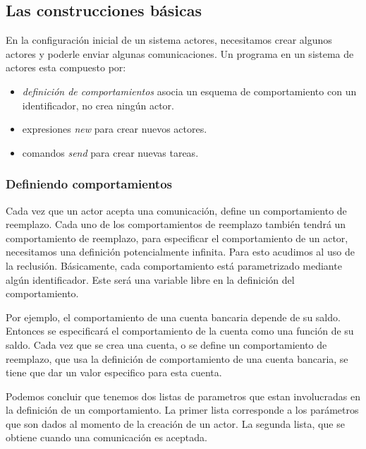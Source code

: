 \subsection{Las construcciones básicas}

En la configuración inicial de un sistema actores, necesitamos crear algunos actores y poderle enviar algunas comunicaciones. Un programa en un sistema de actores esta compuesto por:

\begin{itemize}
 \item \textit{definición de comportamientos} asocia un esquema de comportamiento con un identificador, no crea ningún actor.
 \item expresiones \textit{new} para crear nuevos actores.
 \item comandos \textit{send} para crear nuevas tareas.
\end{itemize}

\subsubsection*{Definiendo comportamientos}\label{actores:comportamientos}
Cada vez que un actor acepta una comunicación, define un comportamiento de reemplazo. Cada uno de los comportamientos de reemplazo también tendrá un comportamiento de reemplazo, para especificar el comportamiento de un actor, necesitamos una definición potencialmente infinita. Para esto acudimos al uso de la reclusión. Básicamente, cada comportamiento está parametrizado mediante algún identificador. Este será una variable libre en la definición del comportamiento. 

Por ejemplo, el comportamiento de una cuenta bancaria depende de su saldo. Entonces se especificará el comportamiento de la cuenta como una función de su saldo. Cada vez que se crea una cuenta, o se define un comportamiento de reemplazo, que usa la definición de comportamiento de una cuenta bancaria, se tiene que dar un valor especifico para esta cuenta.

Podemos concluir que tenemos dos listas de parametros que estan involucradas en la definición de un comportamiento. La primer lista corresponde a los parámetros que son dados al momento de la creación de un actor. La segunda lista, que se obtiene cuando una comunicación es aceptada. 


